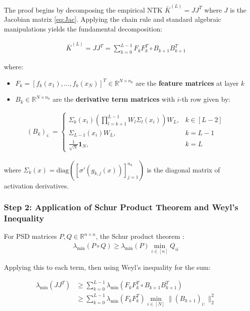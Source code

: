 \documentclass{article}
\newcommand{\R}{\mathbb{R}}
\newcommand{\evmin}[1]{\lambda_{\min}\left(#1\right)}
\begin{document}
The proof begins by decomposing the empirical NTK $\bar{K}^{(L)} = JJ^T$ where $J$ is the Jacobian matrix \eqref{eq:Jac}. Applying the chain rule and standard algebraic manipulations yields the fundamental decomposition:

\begin{align}
\bar{K}^{(L)} = JJ^T = \sum_{k=0}^{L-1} F_k F_k^T \circ B_{k+1} B_{k+1}^T
\end{align}

where:
\begin{itemize}
    \item $F_k = [f_k(x_1), \ldots, f_k(x_N)]^T \in \R^{N \times n_k}$ are the \textbf{feature matrices} at layer $k$
    \item $B_k \in \R^{N \times n_k}$ are the \textbf{derivative term matrices} with $i$-th row given by:
\end{itemize}

\begin{align}
(B_k)_{i:} = \begin{cases}
\Sigma_k(x_i) \left(\prod_{l=k+1}^{L-1} W_l \Sigma_l(x_i)\right) W_L, & k \in [L-2] \\
\Sigma_{L-1}(x_i) W_L, & k = L-1 \\
\frac{1}{\sqrt{N}} \mathbf{1}_N, & k = L
\end{cases}
\end{align}

where $\Sigma_k(x) = \text{diag}([\sigma'(g_{k,j}(x))]_{j=1}^{n_k})$ is the diagonal matrix of activation derivatives.

\subsubsection{Step 2: Application of Schur Product Theorem and Weyl's Inequality}

For PSD matrices $P, Q \in \R^{n \times n}$, the Schur product theorem :
\begin{align}
\evmin{P \circ Q} \geq \evmin{P} \min_{i \in [n]} Q_{ii}
\end{align}

Applying this to each term, then using Weyl's inequality for the sum:

\begin{align}
\evmin{JJ^T} &\geq \sum_{k=0}^{L-1} \evmin{F_k F_k^T \circ B_{k+1} B_{k+1}^T} \\
&\geq \sum_{k=0}^{L-1} \evmin{F_k F_k^T} \min_{i \in [N]} \|(B_{k+1})_{i:}\|_2^2
\end{align}
\end{document}
